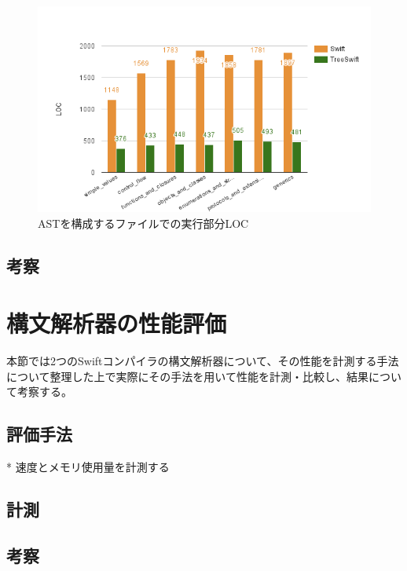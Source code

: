 \begin{figure}
    \begin{center}
        \includegraphics[scale=0.8]{./img/ast_loc_result.png}
        \caption{ASTを構成するファイルでの実行部分LOC}
        \label{img:ast-loc-result}
    \end{center}
\end{figure}

\subsection{考察}


\section{構文解析器の性能評価}

本節では2つのSwiftコンパイラの構文解析器について、その性能を計測する手法について整理した上で実際にその手法を用いて性能を計測・比較し、結果について考察する。

\subsection{評価手法}

* 速度とメモリ使用量を計測する

\subsection{計測}

\subsection{考察}

